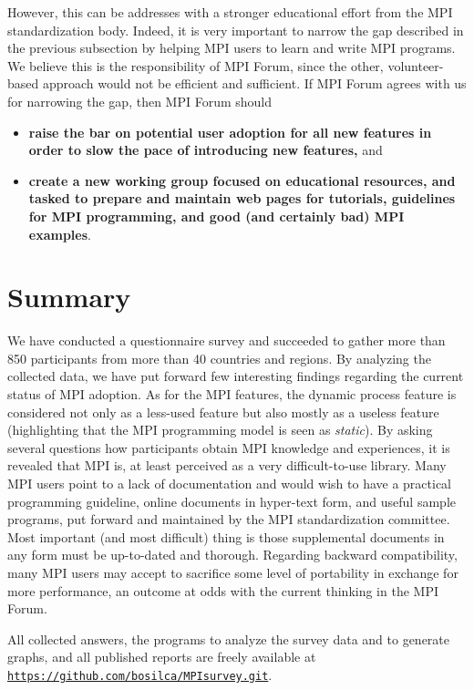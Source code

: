 \documentclass[preprint,5p,times]{elsarticle}
\begin{document}
However, this can be  addresses with a stronger educational effort from the MPI
standardization body. Indeed, it is very important to narrow the gap described in
the previous subsection by helping MPI users to learn and write MPI programs. We
believe this is the responsibility of MPI Forum, since the other,
volunteer-based approach would not be efficient and sufficient. If MPI Forum
agrees with us for narrowing the gap, then MPI Forum should
%
\begin{itemize}
\item {\bf raise the bar on potential user adoption for all new features in
order to slow the pace of introducing new features,} and
%
\item {\bf create a new working group focused on educational resources, and
tasked to prepare and maintain web pages for tutorials, guidelines for MPI
programming, and good (and certainly bad) MPI examples}.
\end{itemize}

\section{Summary}

We have conducted a questionnaire survey and succeeded to gather more than 850
participants from more than 40 countries and regions. By analyzing the collected
data, we have put forward few interesting findings regarding the current status
of MPI adoption. As for the MPI features, the dynamic process feature is
considered not only as a less-used feature but also mostly as a useless feature
(highlighting that the MPI programming model is seen as {\em static}). By asking
several questions how participants obtain MPI knowledge and experiences, it is
revealed that MPI is, at least perceived as a very difficult-to-use library.
 Many MPI users point to a lack of
documentation and would wish to have a practical programming guideline, online
documents in hyper-text form, and useful sample programs, put forward and
maintained by the MPI standardization committee. Most important (and most
difficult) thing is those supplemental documents in any form must be up-to-dated
and thorough. Regarding backward compatibility, many MPI users may accept to
sacrifice some level of portability in exchange for more performance, an outcome
at odds with the current thinking in the MPI Forum.

All collected answers, the programs to analyze the survey data and to
generate graphs, and all published reports are freely available at
{\tt \url{https://github.com/bosilca/MPIsurvey.git}}.
\end{document}
